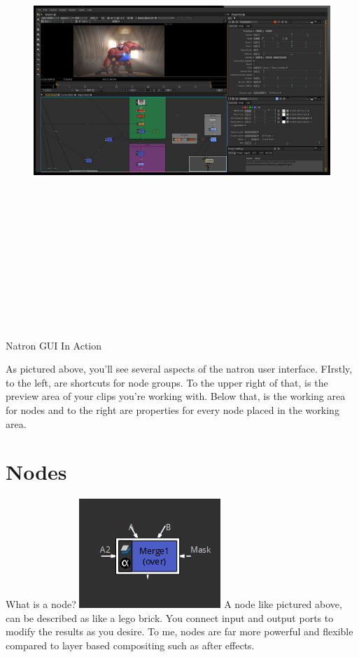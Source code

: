 \documentclass[letterpaper,12pt,oneside]{book}
\begin{document}
\begin{figure}[ht!]
\hspace*{-3cm}
\centering
\includegraphics[width=1.2\textwidth, height=7in]{./imgs/Natron.png}
\end{figure}
Natron GUI In Action

\newpage
As pictured above, you'll see several aspects of the natron user interface. FIrstly, to the left, are shortcuts for node groups. To the upper right of that, is the preview area of your clips you're working with. Below that, is the working area for nodes and to the right are properties for every node placed in the working area.


\section{Nodes}
What is a node?
\bigbreak
\includegraphics{./imgs/mergenode.png}
\bigbreak
A node like pictured above, can be described as like a lego brick.
You connect input and output ports to modify the results as you desire.
To me, nodes are far more powerful and flexible compared to layer based compositing such as after effects.
\end{document}
